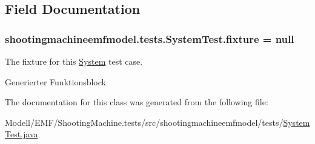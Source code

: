\subsection{Field Documentation}
\hypertarget{classshootingmachineemfmodel_1_1tests_1_1_system_test_a5f1ad8bbe3989dbc43a1a5b5c898f777}{
\subsubsection[{fixture}]{ shootingmachineemfmodel.\-tests.\-System\-Test.\-fixture = null\hspace{0.3cm}{\ttfamily [protected]}}}\label{classshootingmachineemfmodel_1_1tests_1_1_system_test_a5f1ad8bbe3989dbc43a1a5b5c898f777}
The fixture for this \hyperlink{interfaceshootingmachineemfmodel_1_1_system}{System} test case.

Generierter Funktionsblock 

The documentation for this class was generated from the following file\-:\begin{DoxyCompactItemize}
\item 
Modell/\-E\-M\-F/\-Shooting\-Machine.\-tests/src/shootingmachineemfmodel/tests/\hyperlink{_system_test_8java}{System\-Test.\-java}\end{DoxyCompactItemize}
